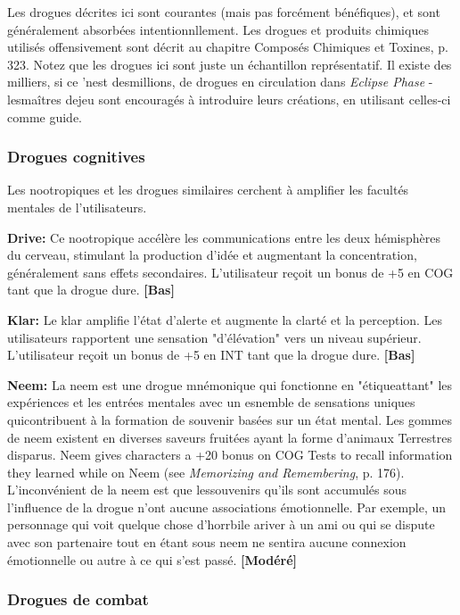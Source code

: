 Les drogues décrites ici sont courantes (mais pas forcément bénéfiques), et sont généralement absorbées intentionnllement. Les drogues et produits chimiques utilisés offensivement sont décrit au chapitre Composés Chimiques et Toxines, p. 323. Notez que les drogues ici sont juste un échantillon représentatif. Il existe des milliers, si ce 'nest desmillions, de drogues en circulation dans \emph{Eclipse Phase} - lesmaîtres dejeu sont encouragés à introduire leurs créations, en utilisant celles-ci comme guide. 

\subsubsection{Drogues cognitives} 

Les nootropiques et les drogues similaires cerchent à amplifier les facultés mentales de l'utilisateurs. 

\textbf{Drive:} Ce nootropique accélère les communications entre les deux hémisphères du cerveau, stimulant la production d'idée et augmentant la concentration, généralement sans effets secondaires. L'utilisateur reçoit un bonus de +5 en COG tant que la drogue dure. \textbf{[Bas]} 

\textbf{Klar:} Le klar amplifie l'état d'alerte et augmente la clarté et la perception. Les utilisateurs rapportent une sensation "d'élévation" vers un niveau supérieur. L'utilisateur reçoit un bonus de +5 en INT tant que la drogue dure. \textbf{[Bas]} 

\textbf{Neem:} La neem est une drogue mnémonique qui fonctionne en "étiqueattant" les expériences et les entrées mentales avec un esnemble de sensations uniques quicontribuent à la formation de souvenir basées sur un état mental. Les gommes de neem existent en diverses saveurs fruitées ayant la forme d'animaux Terrestres disparus. Neem gives characters a +20 bonus on COG Tests to recall information they learned while on Neem (see \emph{Memorizing and Remembering}, p. 176). L'inconvénient de la neem est que lessouvenirs qu'ils sont accumulés sous l'influence de la drogue n'ont aucune associations émotionnelle. Par exemple, un personnage qui voit quelque chose d'horrbile ariver à un ami ou qui se dispute avec son partenaire tout en étant sous neem ne sentira aucune connexion émotionnelle ou autre à ce qui s'est passé. \textbf{[Modéré]} 

\subsubsection{Drogues de combat} 

